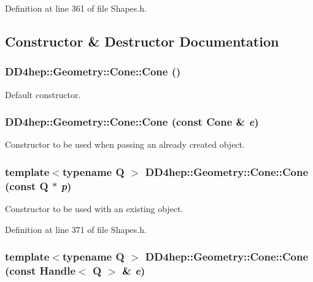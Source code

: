 Definition at line 361 of file Shapes.h.

\subsection{Constructor \& Destructor Documentation}
\hypertarget{class_d_d4hep_1_1_geometry_1_1_cone_ad9b37135d59ce513bbae5aa1452ec310}{
\subsubsection[{Cone}]{\setlength{\rightskip}{0pt plus 5cm}DD4hep::Geometry::Cone::Cone ()}}
\label{class_d_d4hep_1_1_geometry_1_1_cone_ad9b37135d59ce513bbae5aa1452ec310}


Default constructor. \hypertarget{class_d_d4hep_1_1_geometry_1_1_cone_a573980801421cbe77876ca7c98d6991f}{
\subsubsection[{Cone}]{\setlength{\rightskip}{0pt plus 5cm}DD4hep::Geometry::Cone::Cone (const {\bf Cone} \& {\em e})}}
\label{class_d_d4hep_1_1_geometry_1_1_cone_a573980801421cbe77876ca7c98d6991f}


Constructor to be used when passing an already created object. \hypertarget{class_d_d4hep_1_1_geometry_1_1_cone_ab7e9454721d7ef6094c712935933e598}{
\subsubsection[{Cone}]{\setlength{\rightskip}{0pt plus 5cm}template$<$typename Q $>$ DD4hep::Geometry::Cone::Cone (const Q $\ast$ {\em p})}}
\label{class_d_d4hep_1_1_geometry_1_1_cone_ab7e9454721d7ef6094c712935933e598}


Constructor to be used with an existing object. 

Definition at line 371 of file Shapes.h.\hypertarget{class_d_d4hep_1_1_geometry_1_1_cone_ae7e6672c7841cd10b9812956b72ae140}{
\subsubsection[{Cone}]{\setlength{\rightskip}{0pt plus 5cm}template$<$typename Q $>$ DD4hep::Geometry::Cone::Cone (const {\bf Handle}$<$ Q $>$ \& {\em e})}}
\label{class_d_d4hep_1_1_geometry_1_1_cone_ae7e6672c7841cd10b9812956b72ae140}


